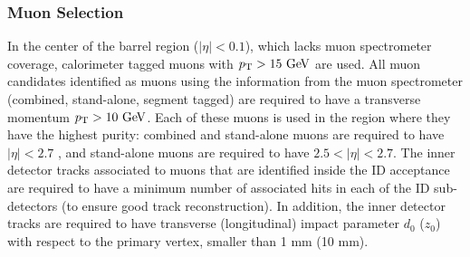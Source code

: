 \subsubsection*{Muon Selection}
In the center of the barrel region ($|\eta| < 0.1$), which lacks muon spectrometer
coverage, calorimeter tagged muons with $\pt > 15 \GeV$ are used. All muon candidates
identified as muons using the information from the muon spectrometer (combined,
stand-alone, segment tagged) are required  to have a transverse momentum 
$\pt > 10 \GeV$. Each of these muons is used in the region where they have
the highest purity: combined and stand-alone muons are required to have $|\eta| < 2.7$
, and stand-alone muons are required to have $2.5 < |\eta| < 2.7$. The inner
detector tracks associated to muons that are identified inside the ID acceptance are
required to have a minimum number of associated hits in each of the ID sub-detectors
(to ensure good track reconstruction). 
In addition, the inner
detector tracks are required to have transverse (longitudinal) impact parameter
$d_0$ ($z_0$) with respect to the primary vertex, smaller than 1 mm (10 mm).

